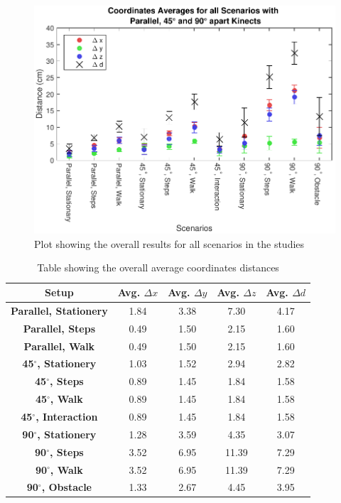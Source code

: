 \begin{figure}[!htb]
  \centering

  \includegraphics[width=0.8\linewidth]{figs/Coordinates_All}

  \caption{Plot showing the overall results for all scenarios in the studies}

  \label{fig:results_overall}
\end{figure}

\begin{table}[!h]
  \centering

  \begin{tabulary}{0.5\linewidth}{||c c c c c||} 
  \hline
  \textbf{Setup} & Avg. $\Delta x$ & Avg. $\Delta y$ & Avg. $\Delta z$ & Avg. $\Delta d$ \\ [0.5ex] 
  \hline\hline
  \textbf{Parallel, Stationery} & 1.84 & 3.38 & 7.30 & 4.17 \\
  \hline
  \textbf{Parallel, Steps} & 0.49 & 1.50 & 2.15 & 1.60 \\
  \hline
  \textbf{Parallel, Walk} & 0.49 & 1.50 & 2.15 & 1.60 \\
  \hline
  \textbf{45$^{\circ}$, Stationery} & 1.03 & 1.52 & 2.94 & 2.82 \\
  \hline
  \textbf{45$^{\circ}$, Steps} & 0.89 & 1.45 & 1.84 & 1.58 \\
  \hline
  \textbf{45$^{\circ}$, Walk} & 0.89 & 1.45 & 1.84 & 1.58 \\
  \hline
  \textbf{45$^{\circ}$, Interaction} & 0.89 & 1.45 & 1.84 & 1.58 \\
  \hline
  \textbf{90$^{\circ}$, Stationery} & 1.28 & 3.59 & 4.35 & 3.07 \\
  \hline
  \textbf{90$^{\circ}$, Steps} & 3.52 & 6.95 & 11.39 & 7.29 \\
  \hline
  \textbf{90$^{\circ}$, Walk} & 3.52 & 6.95 & 11.39 & 7.29 \\
  \hline
  \textbf{90$^{\circ}$, Obstacle} & 1.33 & 2.67 & 4.45 & 3.95 \\
  \hline
  \end{tabulary}
  
  \caption{Table showing the overall average coordinates distances}
  
  \label{table:overall_coordinates_values}
\end{table}


